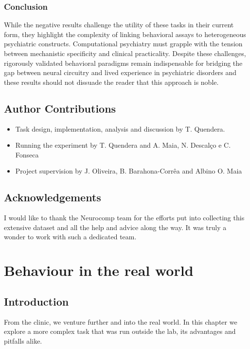 \documentclass[11pt]{article}
\begin{document}
\subsubsection{Conclusion}

While the negative results challenge the utility of these tasks in their current form, they highlight the complexity of linking behavioral assays to heterogeneous psychiatric constructs. Computational psychiatry must grapple with the tension between mechanistic specificity and clinical practicality. Despite these challenges, rigorously validated behavioral paradigms remain indispensable for bridging the gap between neural circuitry and lived experience in psychiatric disorders and these results should not dissuade the reader that this approach is noble.

\subsection{Author Contributions}

\begin{itemize}
    \item Task design, implementation, analysis and discussion by T. Quendera.
    \item Running the experiment by T. Quendera and A. Maia, N. Descalço e C. Fonseca
    \item Project supervision by J. Oliveira, B. Barahona-Corrêa and Albino O. Maia
\end{itemize}

\subsection{Acknowledgements}
I would like to thank the Neurocomp team for the efforts put into collecting this extensive dataset and all the help and advice along the way. It was truly a wonder to work with such a dedicated team.

\clearpage

\section{Behaviour in the real world}
\subsection{Introduction} \label{hexxed_intro}
From the clinic, we venture further and into the real world. In this chapter we explore a more complex task that was run outside the lab, its advantages and pitfalls alike.
\end{document}
